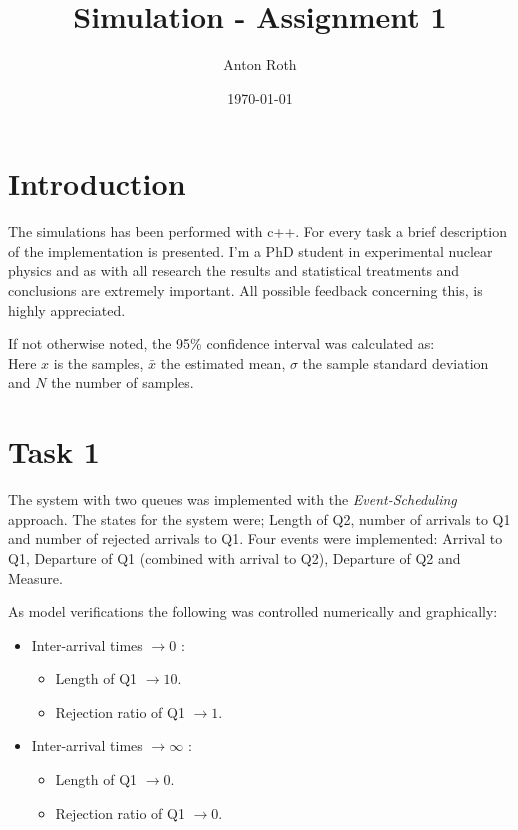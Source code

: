 \documentclass[]{article}
\title{Simulation - Assignment 1}
\author{Anton Roth}
\date{\today}
\begin{document}
\begin{titlepage}
  \maketitle
  \thispagestyle{empty}
\end{titlepage}

\section*{Introduction}
The simulations has been performed with c++.
For every task a brief description of the implementation is presented.
I'm a PhD student in experimental nuclear physics and as with all research the results and statistical treatments and conclusions are extremely important. All possible feedback concerning this, is highly appreciated.

If not otherwise noted, the 95\% confidence interval was calculated as:
\begin{equation*}
  [\bar{x} - 1.96\cdot\frac{\sigma}{\sqrt{N}}, \bar{x} + 1.96\cdot\frac{\sigma}{\sqrt{N}}]
\end{equation*}
Here $x$ is the samples, $\bar{x}$ the estimated mean, $\sigma$ the sample standard deviation and $N$ the number of samples.

\section{Task 1}
The system with two queues was implemented with the {\it Event-Scheduling} approach. The states for the system were; Length of Q2, number of arrivals to Q1 and number of rejected arrivals to Q1. Four events were implemented: Arrival to Q1, Departure of Q1 (combined with arrival to Q2), Departure of Q2 and Measure.

As model verifications the following was controlled numerically and graphically:
\begin{itemize}
  \item Inter-arrival times $\rightarrow 0$ :
    \begin{itemize}
      \item Length of Q1 $\rightarrow 10$.
      \item Rejection ratio of Q1 $\rightarrow 1$.
    \end{itemize}
  \item Inter-arrival times $\rightarrow \infty$ :
    \begin{itemize}
      \item Length of Q1 $\rightarrow 0$.
      \item Rejection ratio of Q1 $\rightarrow 0$.
    \end{itemize}
\end{itemize}
\end{document}
